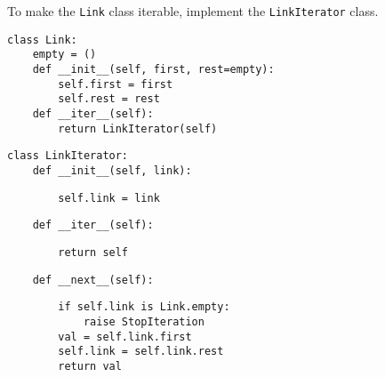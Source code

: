 \question To make the \lstinline$Link$ class iterable, implement the
\lstinline$LinkIterator$ class.

\begin{lstlisting}
class Link:
    empty = ()
    def __init__(self, first, rest=empty):
        self.first = first
        self.rest = rest
    def __iter__(self):
        return LinkIterator(self)
\end{lstlisting}

\begin{blocksection}
\begin{lstlisting}
class LinkIterator:
    def __init__(self, link):
\end{lstlisting}

\begin{solution}[.2in]
\begin{lstlisting}
        self.link = link
\end{lstlisting}
\end{solution}

\begin{lstlisting}
    def __iter__(self):
\end{lstlisting}

\begin{solution}[.2in]
\begin{lstlisting}
        return self
\end{lstlisting}
\end{solution}

\begin{lstlisting}
    def __next__(self):
\end{lstlisting}

\begin{solution}[.9in]
\begin{lstlisting}
        if self.link is Link.empty:
            raise StopIteration
        val = self.link.first
        self.link = self.link.rest
        return val
\end{lstlisting}
\end{solution}
\end{blocksection}
